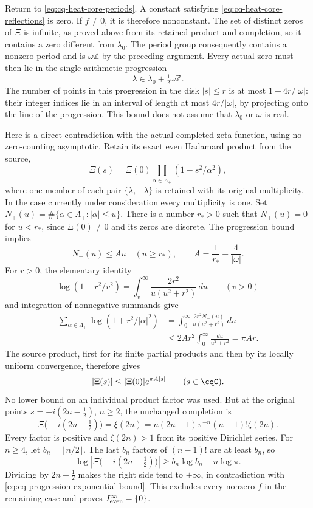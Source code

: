 Return to \eqref{eq:cq-heat-core-periods}. A constant satisfying
\eqref{eq:cq-heat-core-reflections} is zero. If $f\ne0$, it is
therefore nonconstant. The set of distinct zeros of $\Xi$ is
infinite, as proved above from its retained product and completion,
so it contains a zero different from $\lambda_0$.
The period group consequently contains a nonzero period and is
$\omega\mathbb Z$ by the preceding argument. Every actual zero
must then lie in the single arithmetic progression
\begin{equation}\label{eq:cq-heat-core-zero-progression}
 \lambda\in\lambda_0+\tfrac12\omega\mathbb Z.
\end{equation}
The number of points in this progression in the disk $|s|\leq r$
is at most $1+4r/|\omega|$: their integer indices lie in an
interval of length at most $4r/|\omega|$, by projecting onto
the line of the progression. This bound does not assume that
$\lambda_0$ or $\omega$ is real.

Here is a direct contradiction with the actual completed zeta
function, using no zero-counting asymptotic. Retain its exact
even Hadamard product from the source,
\[
 \Xi(s)=\Xi(0)\prod_{\alpha\in\Lambda_+}
                    (1-s^2/\alpha^2),
\]
where one member of each pair $\{\lambda,-\lambda\}$ is
retained with its original multiplicity. In the case currently
under consideration every multiplicity is one.
Set $N_+(u)=\#\{\alpha\in\Lambda_+:|\alpha|\leq u\}$.
There is a number $r_*>0$ such that $N_+(u)=0$ for $u<r_*$,
since $\Xi(0)\ne0$ and its zeros are discrete.
The progression bound implies
\[
 N_+(u)\leq Au\quad(u\geq r_*),\qquad
 A=\frac1{r_*}+\frac4{|\omega|}.
\]
For $r>0$, the elementary identity
\[
 \log(1+r^2/v^2)
   =\int_v^\infty\frac{2r^2}{u(u^2+r^2)}\,du
 \qquad(v>0)
\]
and integration of nonnegative summands give
\[
 \begin{aligned}
 \sum_{\alpha\in\Lambda_+}\log(1+r^2/|\alpha|^2)
 &=\int_0^\infty\frac{2r^2N_+(u)}{u(u^2+r^2)}\,du\\
 &\leq2Ar^2\int_0^\infty\frac{du}{u^2+r^2}
 =\pi Ar .
 \end{aligned}
\]
The source product, first for its finite partial products and
then by its locally uniform convergence, therefore gives
\begin{equation}\label{eq:cq-progression-exponential-bound}
 |\Xi(s)|\leq|\Xi(0)|e^{\pi A|s|}\qquad(s\in\cqC).
\end{equation}
No lower bound on an individual product factor was used.
But at the original points $s=-i(2n-\tfrac12)$, $n\geq2$,
the unchanged completion is
\[
 \Xi\bigl(-i(2n-\tfrac12)\bigr)
 =\xi(2n)
 =n(2n-1)\pi^{-n}(n-1)!\zeta(2n).
\]
Every factor is positive and $\zeta(2n)>1$ from its positive
Dirichlet series. For $n\geq4$, let $b_n=\lfloor n/2\rfloor$.
The last $b_n$ factors of $(n-1)!$ are at least $b_n$, so
\[
 \log\left|\Xi\bigl(-i(2n-\tfrac12)\bigr)\right|
 \geq b_n\log b_n-n\log\pi .
\]
Dividing by $2n-\tfrac12$ makes the right side tend to
$+\infty$, in contradiction with
\eqref{eq:cq-progression-exponential-bound}.
This excludes every nonzero $f$ in the remaining case and
proves $I_{\rm even}^{\infty}=\{0\}$.


